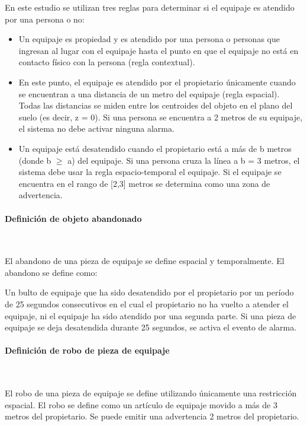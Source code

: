 En este estudio se utilizan tres reglas para determinar si el equipaje es atendido por una persona o no:

\begin{itemize}
    \item Un equipaje es propiedad y es atendido por una persona o personas que ingresan al lugar con el equipaje hasta el punto en que el equipaje no está en contacto físico con la persona (regla contextual).
    \item En este punto, el equipaje es atendido por el propietario únicamente cuando se encuentran a una distancia de un metro del equipaje (regla espacial). Todas las distancias se miden entre los centroides del objeto en el plano del suelo (es decir, z = 0). Si una persona se encuentra a 2 metros de su equipaje, el sistema no debe activar ninguna alarma.
    \item Un equipaje está desatendido cuando el propietario está a más de b metros (donde b $\geqslant$ a) del equipaje. Si una persona cruza la línea a b = 3 metros, el sistema debe usar la regla espacio-temporal el equipaje. Si el equipaje se encuentra en el rango de [2,3] metros se determina como una zona de advertencia.
\end{itemize}

\paragraph*{Definición de objeto abandonado}\mbox{} \\
\label{parag:definicion-abandono-objeto}

El abandono de una pieza de equipaje se define espacial y temporalmente. El abandono se define como:

Un bulto de equipaje que ha sido desatendido por el propietario por un período de 25 segundos consecutivos en el cual el propietario no ha vuelto a atender el equipaje, ni el equipaje ha sido atendido por una segunda parte. Si una pieza de equipaje se deja desatendida durante 25 segundos, se activa el evento de alarma.

\paragraph*{Definición de robo de pieza de equipaje}\mbox{} \\
\label{parag:definicion-robo-pieza-equipaje}

El robo de una pieza de equipaje se define utilizando únicamente una restricción espacial. El robo se define como un artículo de equipaje movido a más de 3 metros del propietario. Se puede emitir una advertencia 2 metros del propietario.

